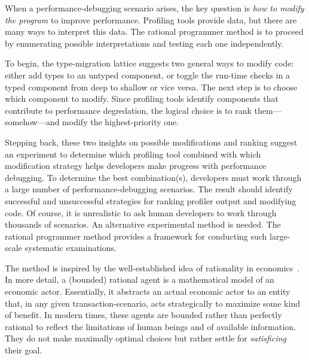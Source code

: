 
When a performance-debugging scenario arises, the key question is \emph{how
to modify the program} to improve performance.
Profiling tools provide data, but there are many ways to interpret this data.
The rational programmer method is to proceed by enumerating possible
interpretations and testing each one independently.

To begin, the type-migration lattice suggests two general ways to modify code:
either add types to an untyped component, or toggle
the run-time checks in a typed component from deep to shallow or vice versa.
The next step is to choose which component to modify.
Since profiling tools identify components that contribute to performance
degredation, the logical choice is to rank them---somehow---and modify the
highest-priority one.

Stepping back, these two insights on possible modifications and ranking suggest
an experiment to determine which profiling tool combined with which
modification strategy helps developers make progress with performance
debugging.
To determine the best combination(s), developers must work through a
large number of performance-debugging scenarios. The result should identify
successful and unsuccessful strategies for ranking profiler output and
modifying code.
Of course, it is unrealistic to ask human developers to work through thousands
of scenarios. An alternative experimental method is needed.
The rational programmer method provides a framework for conducting such
large-scale systematic examinations.

The method is inspired by the well-established idea of rationality in
economics~\cite{mill1874essays, henrich2001search}.  In more detail, a (bounded)
rational agent is a mathematical model of an economic actor. Essentially, it
abstracts an actual economic actor to an entity that, in any given
transaction-scenario, acts strategically to maximize some kind of benefit.
In modern times, these agents are bounded rather than perfectly rational
to reflect the limitations of human beings and of available information.
They do not make maximally optimal choices but rather settle for
\emph{satisficing}~\cite{hs:satisfice} their goal.

